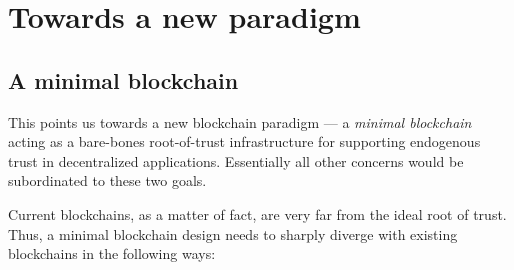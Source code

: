 \documentclass[headinclude,12pt]{scrbook}
\begin{document}
\section{Towards a new paradigm}

\subsection{A minimal blockchain}

This points us towards a new blockchain paradigm --- a \emph{minimal blockchain} acting as a bare-bones root-of-trust infrastructure for supporting endogenous trust in decentralized applications. Essentially all other concerns would be subordinated to these two goals.

Current blockchains, as a matter of fact, are very far from the ideal root of trust. Thus, a minimal blockchain design needs to sharply diverge with existing blockchains in the following ways:
\end{document}
